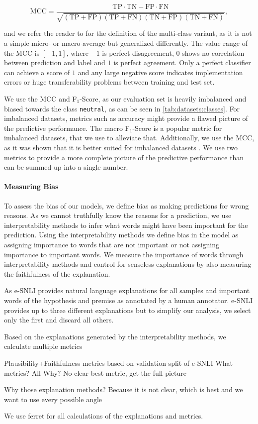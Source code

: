 {\small $$\text{MCC} = \frac{\mathrm
{TP} \cdot \mathrm{TN} - \mathrm{FP} \cdot \mathrm{FN}}{\sqrt{(\mathrm{TP}+\mathrm{FP})(\mathrm{TP}+\mathrm{FN})(\mathrm{TN}+\mathrm{FP})(\mathrm{TN}+\mathrm{FN})}},$$}

and we refer the reader to \citet{mccMultiClass} for the definition of the multi-class variant, as it is not a simple micro- or macro-average but generalized differently. The value range of the \ac{MCC} is $[-1, 1]$, where $-1$ is perfect disagreement, $0$ shows no correlation between prediction and label and $1$ is perfect agreement. Only a perfect classifier can achieve a score of $1$ and any large negative score indicates implementation errors or huge transferability problems between training and test set.

We use the \ac{MCC} and F$_1$-Score, as our evaluation set is heavily imbalanced and biased towards the class \texttt{neutral}, as can be seen in \autoref{tab:datasets:classes}. For imbalanced datasets, metrics such as accuracy might provide a flawed picture of the predictive performance. The macro F$_1$-Score is a popular metric for imbalanced datasets, that we use to alleviate that. Additionally, we use the \ac{MCC}, as it was shown that it is better suited for imbalanced datasets \cite{mccGood}. We use two metrics to provide a more complete picture of the predictive performance than can be summed up into a single number.

\paragraph{Measuring Bias} \label{sec:exp:eval:bias}
To assess the bias of our models, we define bias as making predictions for wrong reasons. As we cannot truthfully know the reasons for a prediction, we use interpretability methods to infer what words might have been important for the prediction. Using the interpretability methods we define bias in the model as assigning importance to words that are not important or not assigning importance to important words. We measure the importance of words through interpretability methods and control for senseless explanations by also measuring the faithfulness of the explanation.

As \ac{e-SNLI} provides natural language explanations for all samples and important words of the hypothesis and premise as annotated by a human annotator. \ac{e-SNLI} provides up to three different explanations but to simplify our analysis, we select only the first and discard all others.

Based on the explanations generated by the interpretability methods, we calculate multiple metrics 

Plausibility+Faithfulness metrics based on validation split of e-SNLI
What metrics? All
Why? No clear best metric, get the full picture

Why those explanation methods? Because it is not clear, which is best and we want to use every possible angle

We use ferret \cite{ferret} for all calculations of the explanations and metrics.

